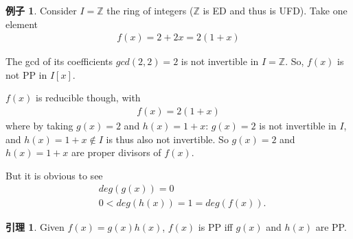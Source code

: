 \documentclass[utf8]{ctexbook}
\theoremstyle{definition}
\newtheorem{example}{例子}[section]
\newtheorem{lemma}{引理}[section]
\begin{document}
\begin{example}
Consider $I = \mathbb{Z}$ the ring of integers ($\mathbb{Z}$ is ED and thus is UFD). Take one element
\begin{align*}
f(x) = 2 + 2x = 2(1+x)
\end{align*}

The gcd of its coefficients $gcd(2,2) = 2$ is not invertible in $I = \mathbb{Z}$. So, $f(x)$ is not PP in $I[x]$. 

$f(x)$ is reducible though, with
\begin{align*}
f(x) = 2 (1+x)
\end{align*}
where by taking $g(x)=2$ and $h(x)=1+x$: $g(x)=2$ is not invertible in $I$, and $h(x) = 1+x \not \in I$ is thus also not invertible. So $g(x) = 2$ and $h(x) = 1+x$ are proper divisors of $f(x)$.

But it is obvious to see
\begin{align*}
& deg(g(x)) = 0 \\
& 0< deg(h(x)) = 1 = deg(f(x)) .
\end{align*}


\end{example}



\begin{lemma}\label{lemma_Factor_poly_ring_1}
Given $f(x) = g(x) h(x)$, $f(x)$ is PP iff $g(x)$ and $h(x)$ are PP. 
\end{lemma}
\end{document}
